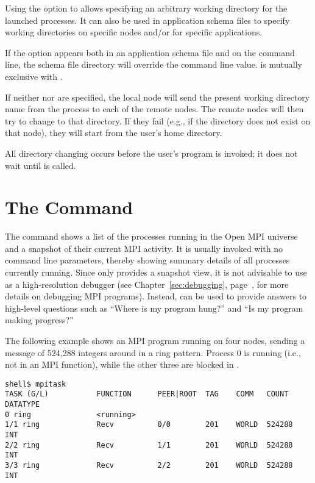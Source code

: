 Using the  option to  allows specifying an
arbitrary working directory for the launched processes.  It can also
be used in application schema files to specify working directories on
specific nodes and/or for specific applications.

If the  option appears both in an application schema file
and on the command line, the schema file directory will override the
command line value.   is mutually exclusive with .

If neither  nor  are specified, the local node
will send the present working directory name from the 
process to each of the remote nodes.  The remote nodes will then try
to change to that directory.  If they fail (e.g., if the directory
does not exist on that node), they will start from the user's home
directory.

All directory changing occurs before the user's program is invoked; it
does not wait until  is called.


\section{The  Command}
\label{sec:commands-mpitask}

The  command shows a list of the processes running in the
Open MPI universe and a snapshot of their current MPI activity.  It is
usually invoked with no command line parameters, thereby showing
summary details of all processes currently running.  
%
Since  only provides a snapshot view, it is not advisable
to use  as a high-resolution debugger (see
Chapter~\ref{sec:debugging}, page~\pageref{sec:debugging}, for more
details on debugging MPI programs).  Instead,  can be
used to provide answers to high-level questions such as ``Where is my
program hung?'' and ``Is my program making progress?''

The following example shows an MPI program running on four nodes,
sending a message of 524,288 integers around in a ring pattern.
Process 0 is running (i.e., not in an MPI function), while the other
three are blocked in .

\lstset{style=lam-cmdline}
\begin{lstlisting}
shell$ mpitask
TASK (G/L)           FUNCTION      PEER|ROOT  TAG    COMM   COUNT   DATATYPE
0 ring               <running>
1/1 ring             Recv          0/0        201    WORLD  524288  INT
2/2 ring             Recv          1/1        201    WORLD  524288  INT
3/3 ring             Recv          2/2        201    WORLD  524288  INT
\end{lstlisting}

